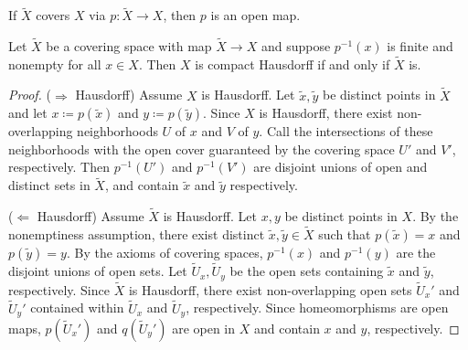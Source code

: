 \documentclass[a5paper]{article}
\newcommand{\wt}{\widetilde}
\begin{document}

\begin{lemma*}
	If $\wt{X}$ covers $X$ via $p:\wt{X}\to X$, then $p$ is an open map.
\end{lemma*}

\begin{proposition*}
	Let $\wt{X}$ be a covering space with map $\wt{X}\to X$ and suppose
  $p^{-1}(x)$ is finite and nonempty for all $x\in X$. Then $X$ is compact
  Hausdorff if and only if $\wt{X}$ is.
\end{proposition*}
\begin{proof}
	($\Rightarrow$ Hausdorff) Assume $X$ is Hausdorff. Let $\wt{x},\wt{y}$ be
  distinct points in $\wt{X}$ and let $x\coloneqq p(\wt{x})$
  and $y\coloneqq p(\wt{y})$. Since $X$ is Hausdorff, there exist non-overlapping
  neighborhoods $U$ of $x$ and $V$ of $y$. Call the intersections of these
  neighborhoods with the open cover guaranteed by the covering space $U'$ and
  $V'$, respectively. Then $p^{-1}(U')$ and $p^{-1}(V')$ are disjoint unions of
  open and distinct sets in $\wt{X}$, and contain $\wt{x}$ and $\wt{y}$
  respectively.

	($\Leftarrow$ Hausdorff) Assume $\wt{X}$ is Hausdorff. Let $x,y$ be
  distinct points in $X$. By the nonemptiness assumption, there exist
  distinct $\wt{x},\wt{y}\in\wt{X}$ such that $p(\wt{x})=x$ and $p(\wt{y})=y$.
  By the axioms of covering spaces, $p^{-1}(x)$ and $p^{-1}(y)$ are the disjoint
  unions of open sets. Let $\wt{U}_x,\wt{U}_y$ be the open sets containing
  $\wt{x}$ and $\wt{y}$, respectively. Since $\wt{X}$ is Hausdorff, there exist
  non-overlapping open sets $\wt{U}_x'$ and $\wt{U}_y'$ contained within
  $\wt{U}_x$ and $\wt{U}_y$, respectively. Since homeomorphisms are open maps,
  $p(\wt{U}_x')$ and $q(\wt{U}_y')$ are open in $X$ and contain $x$ and $y$,
  respectively. 
\end{proof}
\end{document}
